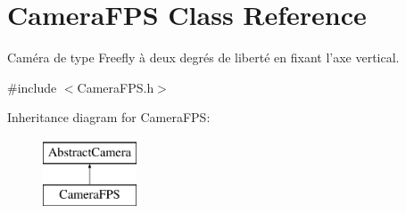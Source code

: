 \hypertarget{classCameraFPS}{\section{Camera\-F\-P\-S Class Reference}
\label{classCameraFPS}
}


Caméra de type Freefly à deux degrés de liberté en fixant l'axe vertical.  




{\ttfamily \#include $<$Camera\-F\-P\-S.\-h$>$}

Inheritance diagram for Camera\-F\-P\-S\-:\begin{figure}[H]
\begin{center}
\leavevmode
\includegraphics[height=2.000000cm]{classCameraFPS}
\end{center}
\end{figure}
